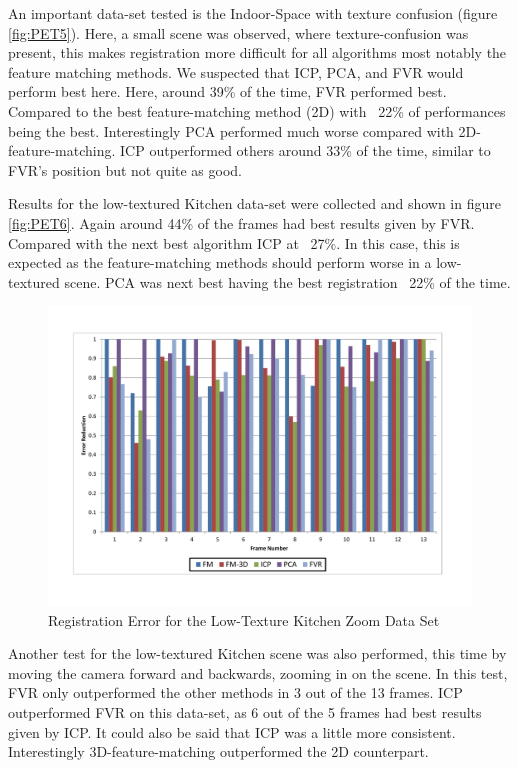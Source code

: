 An important data-set tested is the Indoor-Space with texture confusion (figure \ref{fig:PET5}). Here, a small scene was observed, where texture-confusion was present, this makes registration more difficult for all algorithms most notably the feature matching methods. We suspected that ICP, PCA, and FVR would perform best here. Here, around 39\% of the time, FVR performed best. Compared to the best feature-matching method (2D) with ~22\% of performances being the best. Interestingly PCA performed much worse compared with 2D-feature-matching. ICP outperformed others around 33\% of the time, similar to FVR's position but not quite as good. 

Results for the low-textured Kitchen data-set were collected and shown in figure \ref{fig:PET6}. Again around 44\% of the frames had best results given by FVR. Compared with the next best algorithm ICP at ~27\%. In this case, this is expected as the feature-matching methods should perform worse in a low-textured scene. PCA was next best having the best registration ~22\% of the time.

\begin{figure}[t]
\centering
\includegraphics[width=6.0in]{images/results/Kitchen_Little_Texture_Zoom}
\caption{Registration Error for the Low-Texture Kitchen Zoom Data Set}
\label{fig:PET7}
\end{figure}

Another test for the low-textured Kitchen scene was also performed, this time by moving the camera forward and backwards, zooming in on the scene. In this test, FVR only outperformed the other methods in 3 out of the 13 frames. ICP outperformed FVR on this data-set, as 6 out of the 5 frames had best results given by ICP. It could also be said that ICP was a little more consistent. Interestingly 3D-feature-matching outperformed the 2D counterpart.

